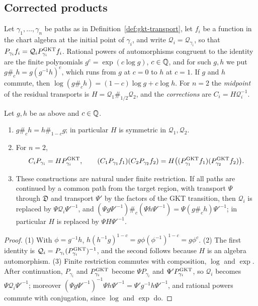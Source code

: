 \subsection{Corrected products}

Let $\gamma_1,\dots,\gamma_n$ be paths as in
Definition~\ref{def:gkt-transport}, let $f_i$ be a function in
the chart algebra at the initial point of $\gamma_i$, and write
$\mathcal Q_i=\mathcal Q_{\gamma_i}$, so that
$P_{\gamma_i}f_i=\mathcal Q_iP^{\mathrm{GKT}}_{\gamma_i}f_i$.  Rational powers of
automorphisms congruent to the identity are the finite polynomials
$g^c=\exp(c\log g)$, $c\in\mathbb Q$, and for such $g,h$ we put
$g\mathbin{\#_c}h=g(g^{-1}h)^c$, which runs from $g$ at $c=0$ to $h$ at
$c=1$.  If $g$ and $h$ commute, then
$\log(g\mathbin{\#_c}h)=(1-c)\log g+c\log h$.  For $n=2$ the \emph{midpoint} of
the residual transports is $H=\mathcal Q_1\mathbin{\#_{1/2}}\mathcal Q_2$,
and the \emph{corrections} are $C_i=H\mathcal Q_i^{-1}$.

\begin{lemma}\label{prop:residual-midpoint}
Let $g,h$ be as above and $c\in\mathbb Q$.
\begin{enumerate}
\item $g\mathbin{\#_c}h=h\mathbin{\#_{1-c}}g$; in particular $H$ is symmetric
in $\mathcal Q_1,\mathcal Q_2$.
\item For $n=2$,
\begin{equation}\label{eq:corrected-product}
 C_iP_{\gamma_i}=HP^{\mathrm{GKT}}_{\gamma_i},
 \qquad
 (C_1P_{\gamma_1}f_1)(C_2P_{\gamma_2}f_2)
 =H\bigl((P^{\mathrm{GKT}}_{\gamma_1}f_1)(P^{\mathrm{GKT}}_{\gamma_2}f_2)\bigr).
\end{equation}
\item These constructions are natural under finite restriction.  If all paths
are continued by a common path from the target region, with transport $\Psi$
through $\mathfrak D$ and transport $\Psi'$ by the factors of the GKT
transition, then $\mathcal Q_i$ is
replaced by $\Psi\mathcal Q_i\Psi'^{-1}$, and
$(\Psi g\Psi'^{-1})\mathbin{\#_c}(\Psi h\Psi'^{-1})
=\Psi(g\mathbin{\#_c}h)\Psi'^{-1}$; in particular $H$ is replaced by
$\Psi H\Psi'^{-1}$.
\end{enumerate}
\end{lemma}

\begin{proof}
(1) With $\phi=g^{-1}h$, $h(h^{-1}g)^{1-c}=g\phi(\phi^{-1})^{1-c}=g\phi^c$.
(2) The first identity is $\mathcal Q_i=P_{\gamma_i}(P^{\mathrm{GKT}}_{\gamma_i})^{-1}$,
and the second follows because $H$ is an algebra automorphism.  (3) Finite
restriction commutes with composition, $\log$ and $\exp$.  After
continuation, $P_{\gamma_i}$ and $P^{\mathrm{GKT}}_{\gamma_i}$ become
$\Psi P_{\gamma_i}$ and $\Psi'P^{\mathrm{GKT}}_{\gamma_i}$, so $\mathcal Q_i$ becomes
$\Psi\mathcal Q_i\Psi'^{-1}$; moreover
$(\Psi g\Psi'^{-1})^{-1}\Psi h\Psi'^{-1}=\Psi'g^{-1}h\Psi'^{-1}$, and
rational powers commute with conjugation, since $\log$ and $\exp$ do.
\end{proof}

